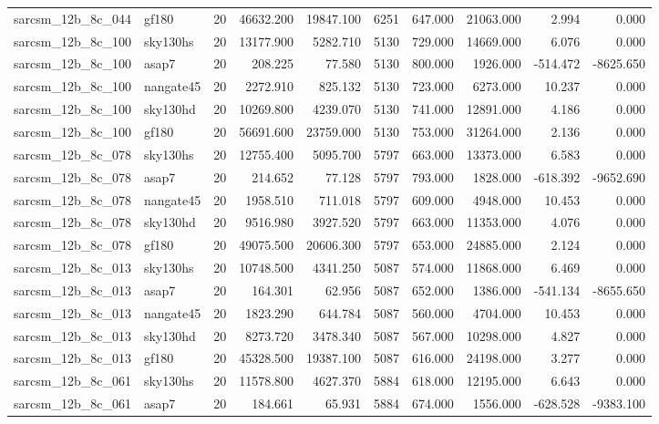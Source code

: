 \begin{longtable}{llrrrrrrrr}
sarcsm\_12b\_8c\_044 & gf180 & 20 & 46632.200 & 19847.100 & 6251 & 647.000 & 21063.000 & 2.994 & 0.000 \\
sarcsm\_12b\_8c\_100 & sky130hs & 20 & 13177.900 & 5282.710 & 5130 & 729.000 & 14669.000 & 6.076 & 0.000 \\
sarcsm\_12b\_8c\_100 & asap7 & 20 & 208.225 & 77.580 & 5130 & 800.000 & 1926.000 & -514.472 & -8625.650 \\
sarcsm\_12b\_8c\_100 & nangate45 & 20 & 2272.910 & 825.132 & 5130 & 723.000 & 6273.000 & 10.237 & 0.000 \\
sarcsm\_12b\_8c\_100 & sky130hd & 20 & 10269.800 & 4239.070 & 5130 & 741.000 & 12891.000 & 4.186 & 0.000 \\
sarcsm\_12b\_8c\_100 & gf180 & 20 & 56691.600 & 23759.000 & 5130 & 753.000 & 31264.000 & 2.136 & 0.000 \\
sarcsm\_12b\_8c\_078 & sky130hs & 20 & 12755.400 & 5095.700 & 5797 & 663.000 & 13373.000 & 6.583 & 0.000 \\
sarcsm\_12b\_8c\_078 & asap7 & 20 & 214.652 & 77.128 & 5797 & 793.000 & 1828.000 & -618.392 & -9652.690 \\
sarcsm\_12b\_8c\_078 & nangate45 & 20 & 1958.510 & 711.018 & 5797 & 609.000 & 4948.000 & 10.453 & 0.000 \\
sarcsm\_12b\_8c\_078 & sky130hd & 20 & 9516.980 & 3927.520 & 5797 & 663.000 & 11353.000 & 4.076 & 0.000 \\
sarcsm\_12b\_8c\_078 & gf180 & 20 & 49075.500 & 20606.300 & 5797 & 653.000 & 24885.000 & 2.124 & 0.000 \\
sarcsm\_12b\_8c\_013 & sky130hs & 20 & 10748.500 & 4341.250 & 5087 & 574.000 & 11868.000 & 6.469 & 0.000 \\
sarcsm\_12b\_8c\_013 & asap7 & 20 & 164.301 & 62.956 & 5087 & 652.000 & 1386.000 & -541.134 & -8655.650 \\
sarcsm\_12b\_8c\_013 & nangate45 & 20 & 1823.290 & 644.784 & 5087 & 560.000 & 4704.000 & 10.453 & 0.000 \\
sarcsm\_12b\_8c\_013 & sky130hd & 20 & 8273.720 & 3478.340 & 5087 & 567.000 & 10298.000 & 4.827 & 0.000 \\
sarcsm\_12b\_8c\_013 & gf180 & 20 & 45328.500 & 19387.100 & 5087 & 616.000 & 24198.000 & 3.277 & 0.000 \\
sarcsm\_12b\_8c\_061 & sky130hs & 20 & 11578.800 & 4627.370 & 5884 & 618.000 & 12195.000 & 6.643 & 0.000 \\
sarcsm\_12b\_8c\_061 & asap7 & 20 & 184.661 & 65.931 & 5884 & 674.000 & 1556.000 & -628.528 & -9383.100 \\

\end{longtable}
